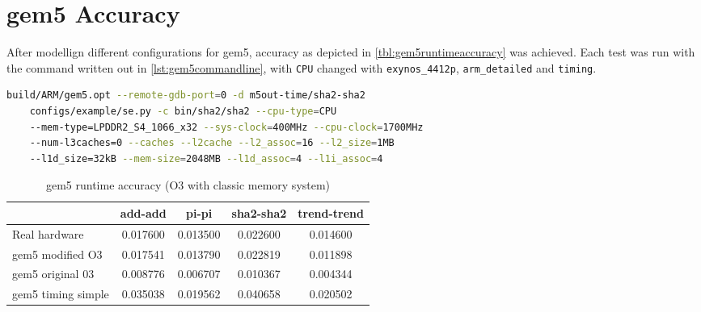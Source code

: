 \section{gem5 Accuracy}

After modellign different configurations for gem5, accuracy as depicted in \autoref{tbl:gem5runtimeaccuracy}
was achieved. Each test was run with the command written out in \autoref{lst:gem5commandline}, with \texttt{CPU}
changed with  \texttt{exynos\_4412p}, \texttt{arm\_detailed} and \texttt{timing}.

\begin{lstlisting}[language=sh,label={lst:gem5commandline},caption={gem5 Command Line}]
build/ARM/gem5.opt --remote-gdb-port=0 -d m5out-time/sha2-sha2
    configs/example/se.py -c bin/sha2/sha2 --cpu-type=CPU
    --mem-type=LPDDR2_S4_1066_x32 --sys-clock=400MHz --cpu-clock=1700MHz
    --num-l3caches=0 --caches --l2cache --l2_assoc=16 --l2_size=1MB
    --l1d_size=32kB --mem-size=2048MB --l1d_assoc=4 --l1i_assoc=4
\end{lstlisting}


\begin{table}
\centering
\begin{tabular}{|l|c|c|c|c|}
\hline
 & add-add & pi-pi & sha2-sha2 & trend-trend \\
\hline
Real hardware & 0.017600  & 0.013500 & 0.022600 & 0.014600 \\
gem5 modified O3    & 0.017541 & 0.013790 & 0.022819 & 0.011898 \\
gem5 original 03    & 0.008776 & 0.006707 & 0.010367 & 0.004344 \\
gem5 timing simple  & 0.035038 & 0.019562 & 0.040658 & 0.020502 \\
\hline
\end{tabular}
\caption{gem5 runtime accuracy (O3 with classic memory system)}
\label{tbl:gem5runtimeaccuracy}
\end{table}
